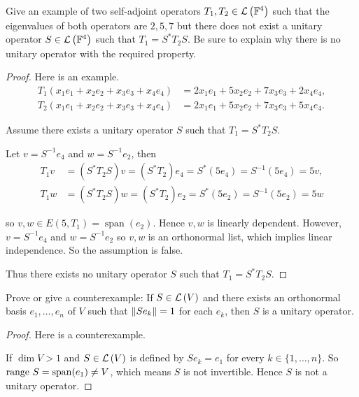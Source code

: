 \begin{exercise}
    Give an example of two self-adjoint operators $T_{1}, T_{2} \in \mathcal{L}\left({\mathbb{F}^{4}}\right)$ such that the eigenvalues of both operators are $2, 5, 7$ but there does not exist a unitary operator $S \in \mathcal{L}\left({\mathbb{F}^{4}}\right)$ such that $T_{1} = S^{*} T_{2} S$. Be sure to explain why there is no unitary operator with the required property.
\end{exercise}

\begin{proof}
    Here is an example.
    \[
        \begin{split}
            T_{1}(x_{1}e_{1} + x_{2}e_{2} + x_{3}e_{3} + x_{4}e_{4}) & = 2x_{1}e_{1} + 5x_{2}e_{2} + 7x_{3}e_{3} + 2x_{4}e_{4}, \\
            T_{2}(x_{1}e_{1} + x_{2}e_{2} + x_{3}e_{3} + x_{4}e_{4}) & = 2x_{1}e_{1} + 5x_{2}e_{2} + 7x_{3}e_{3} + 5x_{4}e_{4}.
        \end{split}
    \]

    Assume there exists a unitary operator $S$ such that $T_{1} = S^{*} T_{2} S$.

    Let $v = S^{-1}e_{4}$ and $w = S^{-1}e_{2}$, then
    \begin{align*}
        T_{1}v & = (S^{*}T_{2}S)v = (S^{*}T_{2})e_{4} = S^{*}(5e_{4}) = S^{-1}(5e_{4}) = 5v, \\
        T_{1}w & = (S^{*}T_{2}S)w = (S^{*}T_{2})e_{2} = S^{*}(5e_{2}) = S^{-1}(5e_{2}) = 5w
    \end{align*}

    so $v, w\in E(5, T_{1}) = \operatorname{span}(e_{2})$. Hence $v, w$ is linearly dependent. However, $v = S^{-1}e_{4}$ and $w = S^{-1}e_{2}$ so $v, w$ is an orthonormal list, which implies linear independence. So the assumption is false.

    Thus there exists no unitary operator $S$ such that $T_{1} = S^{*} T_{2} S$.
\end{proof}
\newpage

\begin{exercise}
    Prove or give a counterexample: If $S\in\mathcal{L}\left({V}\right)$ and there exists an orthonormal basis $e_{1}, \ldots, e_{n}$ of $V$ such that $\left\Vert{Se_{k}}\right\Vert = 1$ for each $e_{k}$, then $S$ is a unitary operator.
\end{exercise}

\begin{proof}
    Here is a counterexample.

    If $\dim V > 1$ and $S\in\mathcal{L}\left({V}\right)$ is defined by $Se_{k} = e_{1}$ for every $k\in\{1,\ldots, n\}$. So $\operatorname{range}\,{S} = \operatorname{span}(e_{1})\ne V$, which means $S$ is not invertible. Hence $S$ is not a unitary operator.
\end{proof}
\newpage

